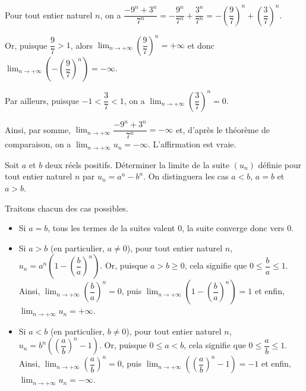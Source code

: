 \documentclass[11pt,fleqn, openany]{book} %
\begin{document}
\begin{solution}
Pour tout entier naturel $n$, on a $\dfrac{-9^n+3^n}{7^n}=-\dfrac{9^n}{7^n}+\dfrac{3^n}{7^n}=-\left(\dfrac{9}{7}\right)^n+\left(\dfrac{3}{7}\right)^n$.

Or, puisque $\dfrac{9}{7}>1$, alors $\displaystyle\lim_{n\to +\infty}\left(\dfrac{9}{7}\right)^n=+\infty$ et donc $\displaystyle\lim_{n\to +\infty}\left(-\left(\dfrac{9}{7}\right)^n\right)=-\infty$.

Par ailleurs, puisque $-1<\dfrac{3}{7}<1$, on a $\displaystyle\lim_{n\to +\infty}\left(\dfrac{3}{7}\right)^n=0$.

Ainsi, par somme, $\displaystyle\lim_{n\to +\infty}\dfrac{-9^n+3^n}{7^n}=-\infty$ et, d'après le théorème de comparaison, on a $\displaystyle\lim_{n \to +\infty}u_n=-\infty$. L'affirmation est vraie.
\end{solution}


\begin{exercise}[topic=lim12]
Soit $a$ et $b$ deux réels positifs. Déterminer la limite de la suite $(u_n)$ définie pour tout entier naturel $n$ par $u_n=a^n-b^n$. On distinguera les cas $a<b$, $a=b$ et $a>b$.
\newpage \end{exercise}

\begin{solution}Traitons chacun des cas possibles.
\begin{itemize}
\item Si $a=b$, tous les termes de la suites valent 0, la suite converge donc vers 0.
\item Si $a>b$ (en particulier, $a\neq 0$), pour tout entier naturel $n$, $u_n=a^n\left(1-\left( \dfrac{b}{a}\right)^n\right)$. Or, puisque $a>b \geqslant 0$, cela signifie que $0\leqslant \dfrac{b}{a} \leqslant 1$. Ainsi, $\displaystyle \lim_{n\to + \infty} \left(\dfrac{b}{a}\right)^n=0$, puis $\displaystyle \lim_{n\to + \infty} \left( 1-\left(\dfrac{b}{a}\right)^n\right)=1$ et enfin, $\displaystyle \lim_{n\to + \infty} u_n=+\infty$.
\item Si $a<b$ (en particulier, $b\neq 0$), pour tout entier naturel $n$, $u_n=b^n\left(\left( \dfrac{a}{b}\right)^n-1\right)$. Or, puisque $0\leqslant a<b $, cela signifie que $0\leqslant \dfrac{a}{b} \leqslant 1$. Ainsi, $\displaystyle \lim_{n\to + \infty} \left(\dfrac{a}{b}\right)^n=0$, puis $\displaystyle \lim_{n\to + \infty} \left( \left(\dfrac{a}{b}\right)^n-1\right)=-1$ et enfin, $\displaystyle \lim_{n\to + \infty} u_n=-\infty$.
\end{itemize}\end{solution}
\end{document}
